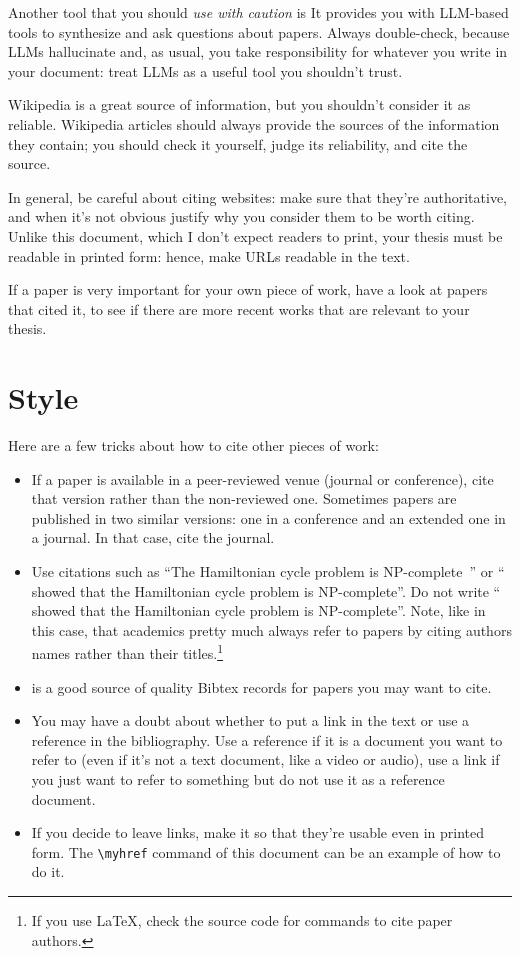 Another tool that you should \emph{use with caution} is
 It provides
you with \ac{LLM}-based tools to synthesize and ask questions about
papers. Always double-check, because \acp{LLM} hallucinate and, as
usual, you take responsibility for whatever you write in your document:
treat \acp{LLM} as a useful tool you shouldn't trust.

Wikipedia is a great source of information, but you shouldn't consider
it as reliable. Wikipedia articles should always provide the sources of
the information they contain; you should check it yourself, judge its
reliability, and cite the source.

In general, be careful about citing websites: make sure that they're
authoritative, and when it's not obvious justify why you consider them
to be worth citing. Unlike this document, which I don't expect readers
to print, your thesis must be readable in printed form: hence, make URLs
readable in the text.

If a paper is very important for your own piece of work, have a look at
papers that cited it, to see if there are more recent works that are
relevant to your thesis.

\section{Style}

Here are a few tricks about how to cite other pieces of work:

\begin{itemize}
  \item If a paper is available in a peer-reviewed venue (journal or conference), cite that
  version rather than the non-reviewed one. Sometimes papers are published in two similar
  versions: one in a conference and an extended one in a journal. In that case, cite the
  journal.
  \item Use citations such as ``The Hamiltonian cycle problem is
  NP-complete~\cite{DBLP:conf/coco/Karp72}'' or ``\textcite{DBLP:conf/coco/Karp72} showed
  that the Hamiltonian cycle problem is NP-complete''. Do not write
  ``\cite{DBLP:conf/coco/Karp72} showed that the Hamiltonian cycle problem is NP-complete''. Note, like in this case, that academics pretty much always refer to papers by citing authors names rather than their titles.\footnote{If you use \LaTeX, check the source code for commands to cite paper authors.}
  \item {} is a good source of quality Bibtex records for papers
  you may want to cite.
  \item You may have a doubt about whether to put a link in the text or use a reference in the bibliography. Use a reference if it is a document you want to refer to (even if it's not a text document, like a video or audio), use a link if you just want to refer to something but do not use it as a reference document.
  \item If you decide to leave links, make it so that they're usable even in printed form. The \verb|\myhref| command of this document can be an example of how to do it.
\end{itemize}
